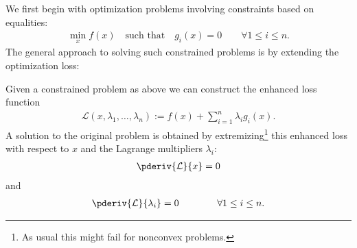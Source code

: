 {    We first begin with optimization problems involving constraints based on equalities:
    \begin{gather}
        \min_x f(x)\quad\text{such that}\quad g_i(x)=0\qquad\forall 1\leq i\leq n.
    \end{gather}
    The general approach to solving such constrained problems is by extending the optimization loss:
    \begin{method}
        Given a constrained problem as above we can construct the enhanced loss function
        \begin{gather}
            \mathcal{L}(x, \lambda_1,\ldots,\lambda_n) := f(x) + \sum_{i=1}^n\lambda_ig_i(x).
        \end{gather}
        A solution to the original problem is obtained by extremizing\footnote{As usual this might fail for nonconvex problems.} this enhanced loss with respect to $x$ and the Lagrange multipliers $\lambda_i$:
        \begin{gather}
            \pderiv{\mathcal{L}}{x} = 0
        \end{gather}
        and
        \begin{gather}
            \pderiv{\mathcal{L}}{\lambda_i} = 0\qquad\qquad\forall1\leq i\leq n.
        \end{gather}
    \end{method}

}
